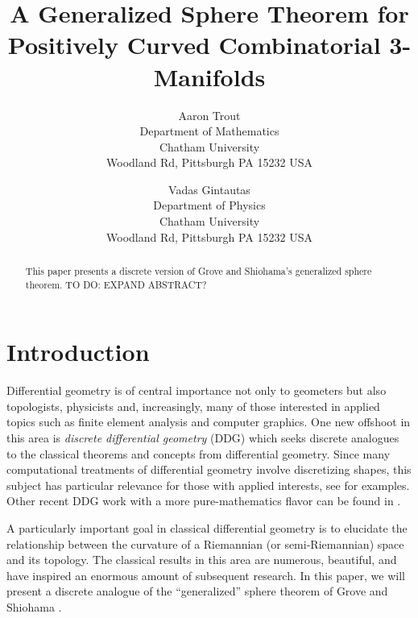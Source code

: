 \documentclass[12pt]{article}
\begin{document}
\nocite{*}

\title{A Generalized Sphere Theorem for Positively Curved Combinatorial 3-Manifolds}

\author{Aaron Trout \\ Department of Mathematics \\
Chatham University \\ Woodland Rd, Pittsburgh PA 15232 USA \and
Vadas Gintautas\\ Department of Physics \\
Chatham University \\ Woodland Rd, Pittsburgh PA 15232 USA}


\maketitle

\begin{abstract}
  This paper presents a discrete version of Grove and Shiohama's generalized sphere theorem. TO DO: EXPAND ABSTRACT?
\end{abstract}


\section{Introduction}

Differential geometry is of central importance not only to geometers but also topologists, physicists and, increasingly, many of those interested in applied topics such as finite element analysis and computer graphics. One new offshoot in this area is {\em discrete differential geometry} (DDG) which seeks discrete analogues to the classical theorems and concepts from differential geometry. Since many computational treatments of differential geometry involve discretizing shapes, this subject has particular relevance for those with applied interests, see \cite{grinspun2006discrete} for examples. Other recent DDG work with a more pure-mathematics flavor can be found in \cite{BMM,Crowley,EMM,forman2,GGL1,GGL2,GGL3,stone}. 

A particularly important goal in classical differential geometry is to elucidate the relationship between the curvature of a Riemannian (or semi-Riemannian) space and its topology. The classical
results in this area are numerous, beautiful, and have inspired an
enormous amount of subsequent research. In this paper, we will present a discrete analogue of the ``generalized'' sphere theorem of Grove and Shiohama \cite{groveshiohama}.
\end{document}
